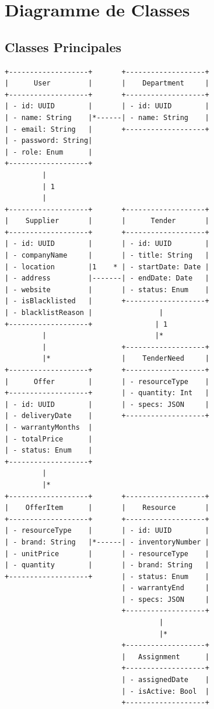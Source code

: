\section{Diagramme de Classes}

\subsection{Classes Principales}

\begin{verbatim}
+-------------------+       +-------------------+
|      User         |       |    Department     |
+-------------------+       +-------------------+
| - id: UUID        |       | - id: UUID        |
| - name: String    |*------| - name: String    |
| - email: String   |       +-------------------+
| - password: String|
| - role: Enum      |
+-------------------+
         |
         | 1
         |
+-------------------+       +-------------------+
|    Supplier       |       |      Tender       |
+-------------------+       +-------------------+
| - id: UUID        |       | - id: UUID        |
| - companyName     |       | - title: String   |
| - location        |1    * | - startDate: Date |
| - address         |-------| - endDate: Date   |
| - website         |       | - status: Enum    |
| - isBlacklisted   |       +-------------------+
| - blacklistReason |                |
+-------------------+               | 1
         |                          |*
         |                  +-------------------+
         |*                 |    TenderNeed     |
+-------------------+       +-------------------+
|      Offer        |       | - resourceType    |
+-------------------+       | - quantity: Int   |
| - id: UUID        |       | - specs: JSON     |
| - deliveryDate    |       +-------------------+
| - warrantyMonths  |
| - totalPrice      |
| - status: Enum    |
+-------------------+
         |
         |*
+-------------------+       +-------------------+
|    OfferItem      |       |    Resource       |
+-------------------+       +-------------------+
| - resourceType    |       | - id: UUID        |
| - brand: String   |*------| - inventoryNumber |
| - unitPrice       |       | - resourceType    |
| - quantity        |       | - brand: String   |
+-------------------+       | - status: Enum    |
                            | - warrantyEnd     |
                            | - specs: JSON     |
                            +-------------------+
                                     |
                                     |*
                            +-------------------+
                            |   Assignment      |
                            +-------------------+
                            | - assignedDate    |
                            | - isActive: Bool  |
                            +-------------------+
\end{verbatim}

